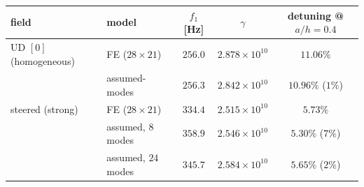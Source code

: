 \begin{tabular}{llccc}
\toprule
field & model & $f_1$ [Hz] & $\gamma$ & detuning @ $a/h{=}0.4$\\
\midrule
UD $[0]$ (homogeneous) & FE ($28\times21$) & $256.0$ & $2.878\!\times\!10^{10}$ & $11.06\%$\\
 & assumed-modes & $256.3$ & $2.842\!\times\!10^{10}$ & $10.96\%$ \;($1\%$)\\
\midrule
steered (strong) & FE ($28\times21$) & $334.4$ & $2.515\!\times\!10^{10}$ & $5.73\%$\\
 & assumed, $8$ modes & $358.9$ & $2.546\!\times\!10^{10}$ & $5.30\%$ \;($7\%$)\\
 & assumed, $24$ modes & $345.7$ & $2.584\!\times\!10^{10}$ & $5.65\%$ \;($2\%$)\\
\bottomrule
\end{tabular}
